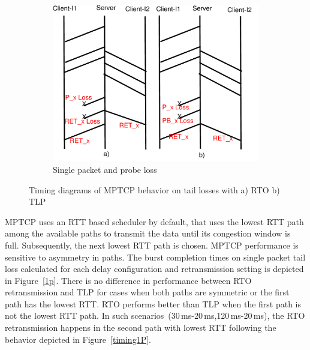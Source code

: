 \documentclass[10pt,conference]{IEEEtran}
\begin{document}
\begin{figure}[!tbp]
\begin{subfigure}[b]{0.32\textwidth}
  	\includegraphics[angle=0, width=\textwidth, natwidth=610, natheight=400]{images/timing1PP.pdf}
	\caption{Single packet and probe loss}\label{timing1PP}
 \end{subfigure}
 \caption{Timing diagrams of MPTCP behavior on tail losses with a) RTO b) TLP }\label{mptiming}	
\end{figure}


MPTCP uses an RTT based scheduler by default, that uses the lowest RTT path among the available paths to transmit the data until its congestion 
window is full. Subsequently, the next lowest RTT path is chosen. MPTCP performance is sensitive to asymmetry in paths. The burst completion times 
on single packet tail loss calculated for each delay configuration and retransmission setting is depicted in Figure~\ref{1p}. There is no 
difference in performance between RTO retransmission and TLP for cases when both paths are symmetric or the first path has the lowest RTT. RTO performs 
better than TLP when the first path is not the lowest RTT path. In such scenarios~(30\,ms-20\,ms,120\,ms-20\,ms), the RTO retransmission happens 
in the second path with lowest RTT following the behavior depicted in Figure~\ref{timing1P}.
\end{document}
